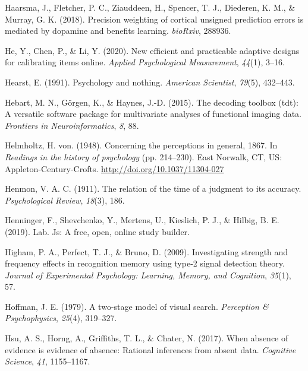 \documentclass[12pt,twoside]{reedthesis}
\begin{document}
\leavevmode\hypertarget{ref-haarsma2018precision}{}%
Haarsma, J., Fletcher, P. C., Ziauddeen, H., Spencer, T. J., Diederen, K. M., \& Murray, G. K. (2018). Precision weighting of cortical unsigned prediction errors is mediated by dopamine and benefits learning. \emph{bioRxiv}, 288936.

\leavevmode\hypertarget{ref-he2020new}{}%
He, Y., Chen, P., \& Li, Y. (2020). New efficient and practicable adaptive designs for calibrating items online. \emph{Applied Psychological Measurement}, \emph{44}(1), 3--16.

\leavevmode\hypertarget{ref-hearst1991psychology}{}%
Hearst, E. (1991). Psychology and nothing. \emph{American Scientist}, \emph{79}(5), 432--443.

\leavevmode\hypertarget{ref-hebart2015decoding}{}%
Hebart, M. N., Görgen, K., \& Haynes, J.-D. (2015). The decoding toolbox (tdt): A versatile software package for multivariate analyses of functional imaging data. \emph{Frontiers in Neuroinformatics}, \emph{8}, 88.

\leavevmode\hypertarget{ref-helmholtz_concerning_1948}{}%
Helmholtz, H. von. (1948). Concerning the perceptions in general, 1867. In \emph{Readings in the history of psychology} (pp. 214--230). East Norwalk, CT, US: Appleton-Century-Crofts. \url{http://doi.org/10.1037/11304-027}

\leavevmode\hypertarget{ref-henmon1911relation}{}%
Henmon, V. A. C. (1911). The relation of the time of a judgment to its accuracy. \emph{Psychological Review}, \emph{18}(3), 186.

\leavevmode\hypertarget{ref-henninger2019lab}{}%
Henninger, F., Shevchenko, Y., Mertens, U., Kieslich, P. J., \& Hilbig, B. E. (2019). Lab. Js: A free, open, online study builder.

\leavevmode\hypertarget{ref-higham2009investigating}{}%
Higham, P. A., Perfect, T. J., \& Bruno, D. (2009). Investigating strength and frequency effects in recognition memory using type-2 signal detection theory. \emph{Journal of Experimental Psychology: Learning, Memory, and Cognition}, \emph{35}(1), 57.

\leavevmode\hypertarget{ref-hoffman1979two}{}%
Hoffman, J. E. (1979). A two-stage model of visual search. \emph{Perception \& Psychophysics}, \emph{25}(4), 319--327.

\leavevmode\hypertarget{ref-hsu2017absence}{}%
Hsu, A. S., Horng, A., Griffiths, T. L., \& Chater, N. (2017). When absence of evidence is evidence of absence: Rational inferences from absent data. \emph{Cognitive Science}, \emph{41}, 1155--1167.
\end{document}
